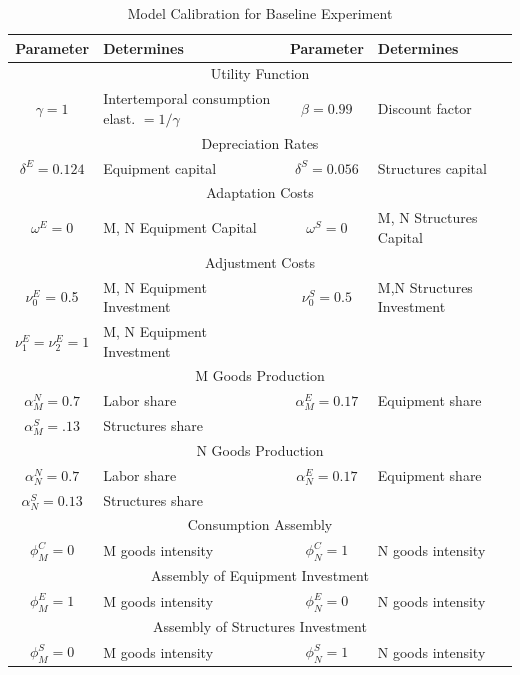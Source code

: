\documentclass[12pt,fleqn]{article}
\renewcommand{\baselinestretch}{1.5}
\begin{document}
\clearpage
\normalsize
\begin{table}[tbp] \caption{Model Calibration for Baseline Experiment}
\label{table_constantparameters} \center \renewcommand{%
\baselinestretch}{1.1} \footnotesize
\begin{tabular}{|c|l|c|l|}
\hline\hline Parameter & Determines & Parameter & Determines \\
\hline \multicolumn{4}{c}{Utility Function} \\ \hline $\gamma = 1$ &
Intertemporal consumption elast. $=1 / \gamma$ & $\beta = 0.99 $ &
Discount factor \\ \hline \multicolumn{4}{c}{Depreciation Rates} \\
\hline $\delta^E = 0.124 $ & Equipment capital & $\delta^S = 0.056 $
& Structures capital \\ \hline \multicolumn{4}{c}{Adaptation Costs}
\\ \hline $\omega^E = 0 $ & M, N Equipment Capital & $\omega^S = 0 $
& M, N Structures
Capital \\
\hline \multicolumn{4}{c}{Adjustment Costs} \\ \hline
$\nu^E_0$ = 0.5 & M, N Equipment Investment & $\nu^S_0 = 0.5 $ & M,N Structures Investment \\
$\nu^E_1=\nu^E_2=1$ & M, N Equipment Investment &  &  \\
\hline \multicolumn{4}{c}{M Goods Production} \\ \hline $\alpha^N_M
= 0.7 $ & Labor share & $\alpha^E_M = 0.17 $ & Equipment share
\\ $\alpha^S_M =.13 $ & Structures share &  &  \\
\hline \multicolumn{4}{c}{N Goods Production} \\ \hline
$\alpha^N_N = 0.7 $ & Labor share & $\alpha^E_N = 0.17$ & Equipment share \\
$\alpha^S_N = 0.13 $ & Structures share &  &  \\
\hline \multicolumn{4}{c}{Consumption Assembly} \\ \hline
$\phi^C_M = 0$ & M goods intensity & $\phi^C_N = 1$ & N goods intensity \\
\hline \multicolumn{4}{c}{Assembly of Equipment Investment} \\
\hline
$\phi^E_M = 1$ & M goods intensity & $\phi^E_N = 0$ & N goods intensity \\
\hline \multicolumn{4}{c}{Assembly of Structures Investment} \\
\hline
$\phi^S_M = 0$ & M goods intensity & $\phi^S_N = 1$ & N goods intensity \\
\hline\hline
\end{tabular}
\end{table}
\end{document}
